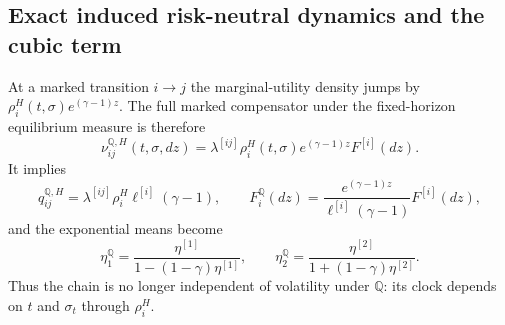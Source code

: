 \documentclass[11pt]{article}
\theoremstyle{remark}
\newcommand{\QQ}{\mathbb{Q}}
\begin{document}
\subsection{Exact induced risk-neutral dynamics and the cubic term}

At a marked transition $i\to j$ the marginal-utility density jumps by
$\rho_i^H(t,\sigma)e^{(\gamma-1)z}$.  The full marked compensator under the
fixed-horizon equilibrium measure is therefore
\begin{equation}\label{eq:regime_Q_kernel}
\nu_{ij}^{\QQ,H}(t,\sigma,dz)=
\lambda^{[ij]}\rho_i^H(t,\sigma)e^{(\gamma-1)z}F^{[i]}(dz).
\end{equation}
It implies
\begin{equation}\label{eq:regime_Q}
q_{ij}^{\QQ,H}=\lambda^{[ij]}\rho_i^H\ell^{[i]}(\gamma-1),
\qquad
F_i^{\QQ}(dz)=\frac{e^{(\gamma-1)z}}{\ell^{[i]}(\gamma-1)}F^{[i]}(dz),
\end{equation}
and the exponential means become
\begin{equation}\label{eq:regime_Q_eta}
\eta_1^{\QQ}=\frac{\eta^{[1]}}{1-(1-\gamma)\eta^{[1]}},
\qquad
\eta_2^{\QQ}=\frac{\eta^{[2]}}{1+(1-\gamma)\eta^{[2]}}.
\end{equation}
Thus the chain is no longer independent of volatility under $\QQ$: its clock
depends on $t$ and $\sigma_t$ through $\rho_i^H$.
\end{document}
